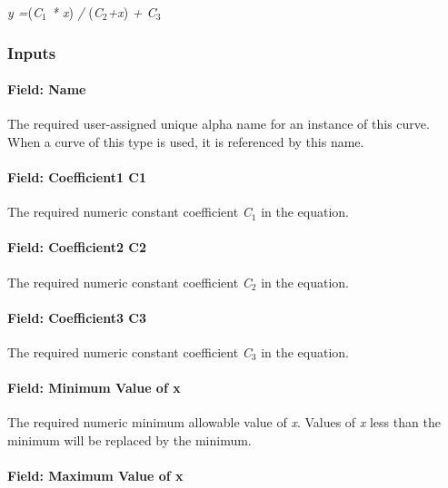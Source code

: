 \emph{y =}(\emph{C\(_{1}\) * x}) \emph{/} (\emph{C\(_{2}\)+x}) \emph{+ C\(_{3}\)}

\subsubsection{Inputs}\label{inputs-15-008}

\paragraph{Field: Name}\label{field-name-15-005}

The required user-assigned unique alpha name for an instance of this curve. When a curve of this type is used, it is referenced by this name.

\paragraph{Field: Coefficient1 C1}\label{field-coefficient1-c1-2}

The required numeric constant coefficient \emph{C\(_{1}\)} in the equation.

\paragraph{Field: Coefficient2 C2}\label{field-coefficient2-c2-2}

The required numeric constant coefficient \emph{C\(_{2}\)} in the equation.

\paragraph{Field: Coefficient3 C3}\label{field-coefficient3-c3-2}

The required numeric constant coefficient \emph{C\(_{3}\)} in the equation.

\paragraph{Field: Minimum Value of x}\label{field-minimum-value-of-x-14}

The required numeric minimum allowable value of \emph{x}. Values of \emph{x} less than the minimum will be replaced by the minimum.

\paragraph{Field: Maximum Value of x}\label{field-maximum-value-of-x-15}

